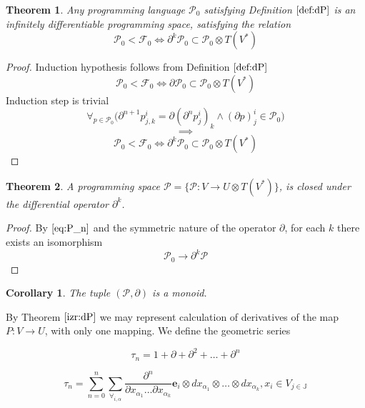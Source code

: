 \documentclass{article}
\newcommand{\JJ}{\mathbb{J}}
\newcommand{\e}{\mathbf{e}}
\newcommand{\F}{\mathcal{F}}
\newcommand{\dP}{\mathcal{P}}
\newcommand{\D}{\partial}
\newcommand{\sumd}{\tau}
\newtheorem{izrek}{Theorem}[section]
\newtheorem{corollary}{Corollary}[section]
\begin{document}
\begin{izrek}\label{izr:P}
	Any programming language $\dP_0$ satisfying Definition $\ref{def:dP}$ is an infinitely differentiable programming space, satisfying the relation
	\begin{equation}\label{eq:P_n}
	 		\dP_0<\F_0\iff\D^k\dP_0\subset\dP_0\otimes T(V^*)
	 	\end{equation}
\end{izrek}
\begin{proof} Induction hypothesis follows from Definition $\ref{def:dP}$
	$$\dP_0<\F_0\iff\D\dP_0\subset\dP_0\otimes T(V^*)$$
	Induction step is trivial
	\begin{equation}\label{eq:inductionStep}
	\forall_{p\in\dP_0}\Big(\D^{n+1}p^i_{j,k}=\D(\D^n p^i_j)_k\land(\D p)^i_j\in\dP_0\Big)
	\end{equation}
	$$\implies$$
	$$\dP_0<\F_0\iff\D^k\dP_0\subset\dP_0\otimes T(V^*)$$
\end{proof}

 \begin{izrek}\label{izr:dP}
	A programming space $\dP=\{\dP:V\to U\otimes T(V^*)\}$, is closed under the differential operator $\D^k$.
 \end{izrek}
 \begin{proof}
 	 By $\eqref{eq:P_n}$ and the symmetric nature of the operator $\D$, for each $k$ there exists an isomorphism
 	 	\begin{equation}
 	 		\dP_0\to\D^k\dP
 	 	\end{equation}
 \end{proof}

\begin{corollary}\label{cor:dpMonoid}
The tuple $(\dP,\D)$ is a monoid.
\end{corollary}

By Theorem $\ref{izr:dP}$ we may represent calculation of derivatives of the map $P:V\to U$, with only one mapping. We define the geometric series
 
 \begin{equation}\label{eq:DD}
  	\sumd_n = 1+\D +\D^2 +\ldots + \D^n 
  \end{equation}
  
  
  \begin{equation}
  	\sumd_n=\sum\limits_{n=0}^{n}\sum_{\forall_{i,\alpha}}\frac{\partial^n}{\partial
  		    x_{\alpha_1}\ldots \partial x_{\alpha_k}}\e_i\otimes
  		  dx_{\alpha_1}\otimes\ldots \otimes dx_{\alpha_k} , x_i\in V_{j\in\JJ}
  \end{equation}
  
\end{document}
